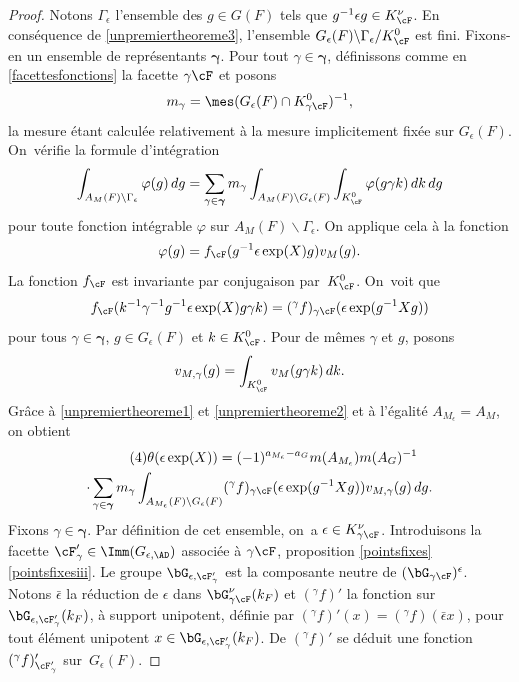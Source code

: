 \begin{proof}
Notons $\Gamma_{\epsilon}$ l'ensemble des $g\in G(F)$ tels que $g^{-1}\epsilon g\in K_{\cF}^{\nu}$. En conséquence de \eqref{unpremiertheoreme3}, l'ensemble $G_{\epsilon}(F)\backslash \Gamma_{\epsilon}/K_{\cF}^0$ est fini. Fixons-en un ensemble de représentants $\boldsymbol{\gamma}$. Pour tout $\gamma\in \boldsymbol{\gamma}$, définissons comme en \ref{facettesfonctions} la facette $\gamma\cF$ et posons
\[
m_{\gamma}=\mes(G_{\epsilon}(F)\cap K_{\gamma\cF}^0)^{-1},
\]
la mesure étant calculée relativement à la mesure implicitement fixée sur $G_{\epsilon}(F)$. On~vérifie la formule d'intégration\vspace*{-3pt}
\[
\int_{A_{M}(F)\backslash\Gamma_{\epsilon}}\varphi(g)\,dg=\sum_{\gamma\in \boldsymbol{\gamma}}m_{\gamma}\int_{A_{M}(F)\backslash G_{\epsilon}(F)}\int_{K_{\cF}^0}\varphi(g\gamma k)\,dk\,dg
\]
pour toute fonction intégrable $\varphi$ sur $A_{M}(F)\backslash \Gamma_{\epsilon}$. On applique cela à la fonction\vspace*{-3pt}\enlargethispage{.5\baselineskip}%
\[
\varphi(g)=f_{\cF}(g^{-1}\epsilon \exp(X) g)v_{M}(g).
\]
La fonction $f_{\cF} $ est invariante par conjugaison par~$K_{\cF}^0$. On~voit que\vspace*{-3pt}
\[
f_{\cF}(k^{-1}\gamma^{-1}g^{-1}\epsilon \exp(X)g \gamma k)=(^{\gamma}f)_{\gamma\cF}(\epsilon \exp(g^{-1}Xg))
\]
pour tous $\gamma\in \boldsymbol{\gamma}$, $g\in G_{\epsilon}(F)$ et $k\in K_{\cF}^0$. Pour de mêmes
$\gamma$ et $g$, posons\vspace*{-3pt}
\[
v_{M,\gamma}(g)=\int_{K_{\cF}^0}v_{M}(g\gamma k)\,dk.
\]
Grâce à \eqref{unpremiertheoreme1} et \eqref{unpremiertheoreme2} et à l'égalité $A_{M_{\epsilon}}=A_{M}$, on obtient\vspace*{-3pt}
\begin{multline*}\tag{4}\label{unpremiertheoreme4}
\theta(\epsilon \exp(X))=(-1)^{a_{M_{\epsilon}}-a_{G}}m(A_{M_{\epsilon}})m(A_{G})^{-1}\\
\cdot\sum_{\gamma\in \boldsymbol{\gamma}}m_{\gamma}
\int_{A_{M_{\epsilon}}(F)\backslash G_{\epsilon}(F)}(^{\gamma}f)_{\gamma\cF}(\epsilon \exp(g^{-1}X g))v_{M,\gamma} (g)\,dg.
\end{multline*}
Fixons $\gamma\in \boldsymbol{\gamma}$.
Par définition de cet ensemble, on~a $\epsilon\in K_{\gamma\cF}^{\nu}$. Introduisons la facette $\cF'_{\gamma}\in \Imm(G_{\epsilon,\AD})$ associée à $\gamma\cF$, \cf proposition \ref{pointsfixes}\,\eqref{pointsfixesiii}. Le groupe $\bG_{\epsilon,\cF_{\gamma}'}$ est la composante neutre de $(\bG_{\gamma\cF})^{\epsilon}$.
Notons $\bar{\epsilon}$ la réduction de $\epsilon$ dans $\bG^{\nu}_{\gamma\cF}(k_{F})$ et $(^{\gamma}f)'$ la fonction sur $\bG_{\epsilon,\cF'_{\gamma}}(k_{F})$, à support unipotent, définie par $(^{\gamma}f)'(x)=(^{\gamma}f)(\bar{\epsilon}x)$, pour tout élément unipotent $x\in \bG_{\epsilon,\cF'_{\gamma}}(k_{F})$. De $(^{\gamma}f)'$ se déduit une fonction $(^{\gamma}f)'_{\cF'_{\gamma}}$ sur~$G_{\epsilon}(F)$.


\end{proof}
